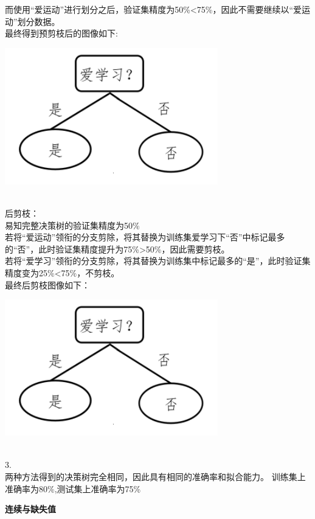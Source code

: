 \documentclass[answers]{exam}  %
\begin{document}
\begin{questions}
\begin{solution}
        而使用“爱运动”进行划分之后，验证集精度为50\%<75\%，因此不需要继续以“爱运动”划分数据。\\
        最终得到预剪枝后的图像如下:\\
        \centerline{\includegraphics[width=0.5\linewidth]{prepruning.png}}\\
        后剪枝：\\
        易知完整决策树的验证集精度为50\%\\
        若将“爱运动”领衔的分支剪除，将其替换为训练集爱学习下“否”中标记最多的“否”，此时验证集精度提升为75\%>50\%，因此需要剪枝。\\
        若将“爱学习”领衔的分支剪除，将其替换为训练集中标记最多的“是”，此时验证集精度变为25\%<75\%，不剪枝。\\
        最终后剪枝图像如下：\\
        \centerline{\includegraphics[width=0.5\linewidth]{prepruning.png}}\\
        3.\\
        两种方法得到的决策树完全相同，因此具有相同的准确率和拟合能力。
        训练集上准确率为80\%,测试集上准确率为75\%
	\end{solution}

\question [20] \textbf{连续与缺失值}




\end{questions}
\end{document}
